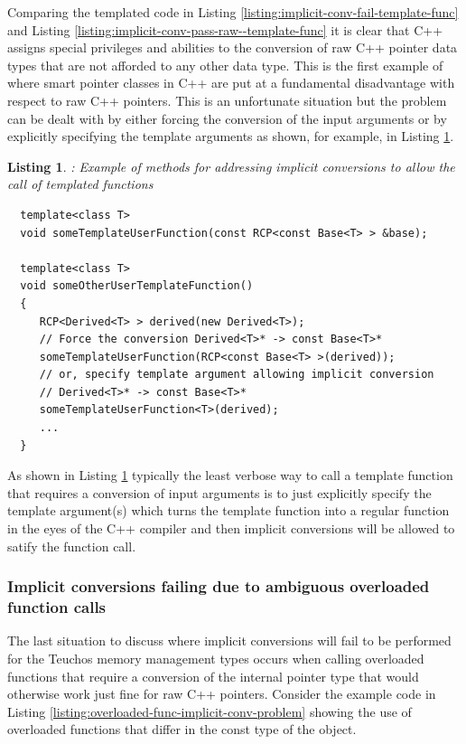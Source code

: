 \documentclass[pdf,ps2pdf,11pt]{SANDreport}
\newtheorem{listing}{Listing}
\begin{document}
Comparing the templated code in Listing
{}\ref{listing:implicit-conv-fail-template-func} and Listing
{}\ref{listing:implicit-conv-pass-raw--template-func} it is clear that
C++ assigns special privileges and abilities to the conversion of raw
C++ pointer data types that are not afforded to any other data type.
This is the first example of where smart pointer classes in C++ are
put at a fundamental disadvantage with respect to raw C++ pointers.
This is an unfortunate situation but the problem can be dealt with by
either forcing the conversion of the input arguments or by explicitly
specifying the template arguments as shown, for example, in Listing
{}\ref{listing:implicit-conv-pass-explicit-template-func}.


{}\begin{listing}: Example of methods for addressing implicit
conversions to allow the call of templated functions
\label{listing:implicit-conv-pass-explicit-template-func}
{\small\begin{verbatim}
  template<class T>
  void someTemplateUserFunction(const RCP<const Base<T> > &base);

  template<class T>
  void someOtherUserTemplateFunction()
  {
     RCP<Derived<T> > derived(new Derived<T>);
     // Force the conversion Derived<T>* -> const Base<T>*
     someTemplateUserFunction(RCP<const Base<T> >(derived));
     // or, specify template argument allowing implicit conversion
     // Derived<T>* -> const Base<T>*
     someTemplateUserFunction<T>(derived);
     ...
  }
\end{verbatim}}
\end{listing}


As shown in Listing
{}\ref{listing:implicit-conv-pass-explicit-template-func} typically
the least verbose way to call a template function that requires a
conversion of input arguments is to just explicitly specify the
template argument(s) which turns the template function into a regular
function in the eyes of the C++ compiler and then implicit conversions
will be allowed to satify the function call.


%
{}\subsubsection*{Implicit conversions failing due to ambiguous
overloaded function calls}
%

The last situation to discuss where implicit conversions will fail to
be performed for the Teuchos memory management types occurs when
calling overloaded functions that require a conversion of the internal
pointer type that would otherwise work just fine for raw C++ pointers.
Consider the example code in Listing
{}\ref{listing:overloaded-func-implicit-conv-problem} showing the use
of overloaded functions that differ in the const type of the object.
\end{document}
